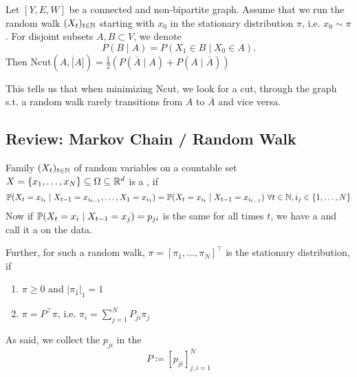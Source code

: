\begin{theorem}\label{thm:2.25}
    Let $[Y,E,W]$ be a connected and non-bipartite graph. Assume that we run the random walk 
    $(X_t)_{t\in \mathbb{N}}$ starting with $x_0$ in the stationary distribution $\pi$, i.e. $x_0\sim\pi$. For disjoint subsets $A,B\subset V$, we denote 
    \[P(B\mid A)=P(X_1\in B\mid X_0\in A).\]
    Then Ncut$(A,\overline[A])=\frac{1}{2}\left(P(\overline{A}\mid A)+P(A\mid \overline{A})\right)$
\end{theorem}

This tells us that when minimizing Ncut, we look for a cut, through the graph s.t. a random walk rarely transitions 
from $A$ to $\overline{A}$ and vice versa.


\subsection*{Review: Markov Chain / Random Walk}

Family $(X_t)_{t\in\mathbb{N}}$ of random variables on a countable set $X=\{x_1,\dots,x_N\}\subseteq \Omega\subseteq \mathbb{R}^d$
is a , if 
\[\mathbb{P}(X_t=x_{i_t}\mid X_{t-1}=x_{i_{t-1}},\dots,X_1=x_{i_1})=\mathbb{P}(X_t=x_{i_t}\mid X_{t-1}=x_{i_{t-1}})\ \forall t\in\mathbb{N},i_j\in\{1,\dots,N\}\]
Now if $\mathbb{P}(X_t=x_i\mid X_{t-1}=x_j)=p_{ji}$ is the same for all times $t$, we have a 
 and call it a  on the data.

Further, for such a random walk, $\pi=[\pi_1,\dots,\pi_N]^\intercal$ is the stationary distribution, if 
\begin{enumerate}
    \item $\pi\geq 0$ and $|\pi_1|_1=1$
    \item $\pi=P^\intercal\pi$, i.e. $\pi_i=\sum_{j=1}^NP_{ji}\pi_j$
\end{enumerate}
As said, we collect the $p_{ji}$ in the 
\[P\coloneqq [p_{ji}]_{j,i=1}^N\]

